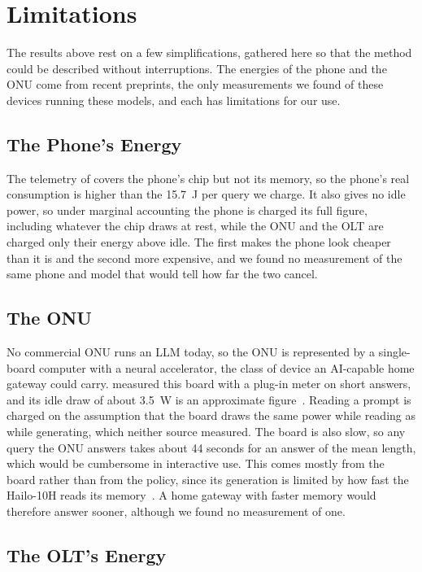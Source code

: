 \documentclass[cic,dipl,english]{infufrgs}
\begin{document}
\section{Limitations}
\label{sec:limitations}

The results above rest on a few simplifications, gathered here so that the method could be
described without interruptions. The energies of the phone and the ONU come from recent
preprints, the only measurements we found of these devices running these models, and each has
limitations for our use.

\subsection{The Phone's Energy}

The telemetry of  covers the phone's chip but not its memory, so the
phone's real consumption is higher than the 15.7~J per query we charge. It also gives no idle
power, so under marginal accounting the phone is charged its full figure, including whatever
the chip draws at rest, while the ONU and the OLT are charged only their energy above idle.
The first makes the phone look cheaper than it is and the second more expensive, and we found
no measurement of the same phone and model that would tell how far the two cancel.

\subsection{The ONU}

No commercial ONU runs an LLM today, so the ONU is represented by a single-board computer with
a neural accelerator, the class of device an AI-capable home gateway could carry.
 measured this board with a plug-in meter on short answers, and its
idle draw of about 3.5~W is an approximate figure~\cite{tummalapalli2026edge}. Reading a prompt
is charged on the assumption that the board draws the same power while reading as while
generating, which neither source measured. The board is also slow, so any query the ONU answers
takes about 44 seconds for an answer of the mean length, which would be cumbersome in
interactive use. This comes mostly from the board rather than from the policy, since its
generation is limited by how fast the Hailo-10H reads its memory~\cite{tummalapalli2026edge}.
A home gateway with faster memory would therefore answer sooner, although we found no
measurement of one.

\subsection{The OLT's Energy}
\end{document}
